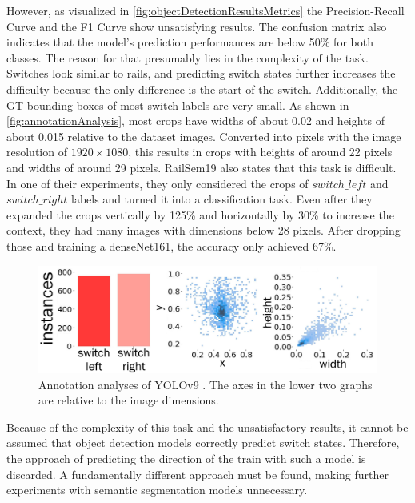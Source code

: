 \clearpage

\noindent However, as visualized in \autoref{fig:objectDetectionResultsMetrics} the Precision-Recall Curve and the F1 Curve show unsatisfying results.
The confusion matrix also indicates that the model's prediction performances are below 50\% for both classes.
The reason for that presumably lies in the complexity of the task.
Switches look similar to rails, and predicting switch states further increases the difficulty because the only difference is the start of the switch.
Additionally, the \ac{GT} bounding boxes of most switch labels are very small.
As shown in \autoref{fig:annotationAnalysis}, most crops have widths of about 0.02 and heights of about 0.015 relative to the dataset images.
Converted into pixels with the image resolution of $1920 \times 1080$, this results in crops with heights of around 22 pixels and widths of around 29 pixels.
RailSem19 \cite{railsem19dataset} also states that this task is difficult.
In one of their experiments, they only considered the crops of $switch\_left$ and $switch\_right$ labels and turned it into a classification task.
Even after they expanded the crops vertically by 125\% and horizontally by 30\% to increase the context, they had many images with dimensions below 28 pixels.
After dropping those and training a denseNet161, the accuracy only achieved 67\%.

\vspace{0.5cm}

\begin{figure}[H]
    \centering
    \includegraphics[width=\linewidth]{PICs/experiments/objectdetectionExperiment/labels_updated_v2.jpg}
    \caption{Annotation analyses of \ac{YOLO}v9 \cite{YOLOv9GitHub}. The axes in the lower two graphs are relative to the image dimensions.}
    \label{fig:annotationAnalysis}
\end{figure}


\noindent Because of the complexity of this task and the unsatisfactory results, it cannot be assumed that object detection models correctly predict switch states.
Therefore, the approach of predicting the direction of the train with such a model is discarded.
A fundamentally different approach must be found, making further experiments with semantic segmentation models unnecessary.